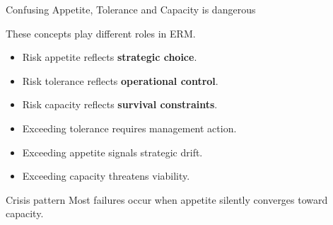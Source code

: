 \documentclass[aspectratio=169, 10pt]{beamer} %
\begin{document}
\begin{frame}{Confusing Appetite, Tolerance and Capacity is dangerous}

These concepts play different roles in ERM.

\medskip

\begin{itemize}
    \item Risk appetite reflects \textbf{strategic choice}.
    
    \item Risk tolerance reflects \textbf{operational control}.
    
    \item Risk capacity reflects \textbf{survival constraints}.
\end{itemize}

\medskip

\begin{itemize}
    \item Exceeding tolerance requires management action.
    \item Exceeding appetite signals strategic drift.
    \item Exceeding capacity threatens viability.
\end{itemize}

\begin{block}{Crisis pattern}
Most failures occur when appetite silently converges toward capacity.
\end{block}

\end{frame}
\end{document}
